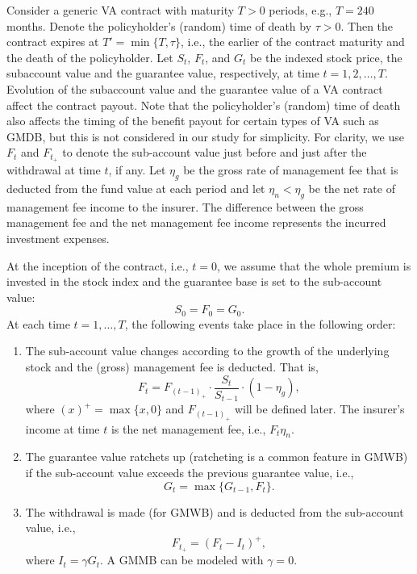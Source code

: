 Consider a generic VA contract with maturity $T>0$ periods, e.g., $T=240$ months.
Denote the policyholder's (random) time of death by $\tau>0$.
Then the contract expires at $T'=\min\{T,\tau\}$, i.e., the earlier of the contract maturity and the death of the policyholder.
Let $S_t$, $F_t$, and $G_t$ be the indexed stock price, the subaccount value and the guarantee value, respectively, at time $t=1,2,\ldots,T$.
Evolution of the subaccount value and the guarantee value of a VA contract affect the contract payout.
Note that the policyholder's (random) time of death also affects the timing of the benefit payout for certain types of VA such as GMDB, but this is not considered in our study for simplicity.
For clarity, we use $F_t$ and $F_{t_+}$ to denote the sub-account value just before and just after the withdrawal at time $t$, if any.
Let $\eta_g$ be the gross rate of management fee that is deducted from the fund value at each period and let $\eta_n < \eta_g$ be the net rate of management fee income to the insurer.
The difference between the gross management fee and the net management fee income represents the incurred investment expenses.

At the inception of the contract, i.e., $t=0$, we assume that the whole premium is invested in the stock index and the guarantee base is set to the sub-account value:
\begin{equation*}
    S_0=F_0=G_0.
\end{equation*}
At each time $t=1,\ldots,T$, the following events take place in the following order:
\begin{enumerate}
    \item The sub-account value changes according to the growth of the underlying stock and the (gross) management fee is deducted. That is, 
        \begin{equation*}
            F_t = F_{(t-1)_+}\cdot\frac{S_{t}}{S_{t-1}}\cdot(1-\eta_g),
        \end{equation*} 
    where $(x)^+=\max\{x,0\}$ and $F_{(t-1)_+}$ will be defined later. The insurer's income at time $t$ is the net management fee, i.e., $F_t\eta_n$. 

    \item The guarantee value ratchets up (ratcheting is a common feature in GMWB) if the sub-account value exceeds the previous guarantee value, i.e., 
        \begin{equation*}
            G_t = \max\{G_{t-1},F_t\}.
        \end{equation*} 

    \item The withdrawal is made (for GMWB) and is deducted from the sub-account value, i.e., 
        \begin{equation*}
            F_{t_+} = (F_t - I_t)^+,
        \end{equation*} 
    where $I_t = \gamma G_t$. A GMMB can be modeled with $\gamma = 0$.
\end{enumerate}

